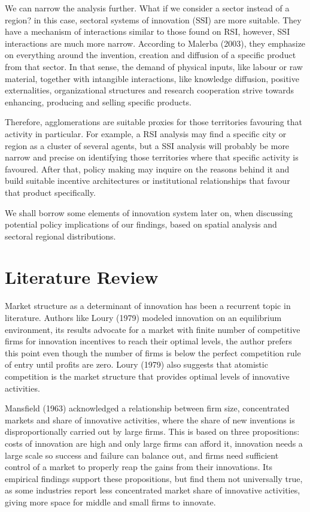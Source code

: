 \documentclass[12pt,a4paper]{article}
\begin{document}
We can narrow the analysis further. What if we consider a sector instead of a region? in this case, sectoral systems of innovation (SSI) are more suitable. They have a mechanism of interactions similar to those found on RSI, however, SSI interactions are much more narrow. According to Malerba (2003), they emphasize on everything around the invention, creation and diffusion of a specific product from that sector. In that sense, the demand of physical inputs, like labour or raw material, together with intangible interactions, like knowledge diffusion, positive externalities, organizational structures and research cooperation strive towards enhancing, producing and selling specific products. 

Therefore, agglomerations are suitable proxies for those territories favouring that activity in particular. For example, a RSI analysis may find a specific city or region as a cluster of several agents, but a SSI analysis will probably be more narrow and precise on identifying those territories where that specific activity is favoured. After that, policy making may inquire on the reasons behind it and build suitable incentive architectures or institutional relationships that favour that product specifically.

We shall borrow some elements of innovation system later on, when discussing potential policy implications of our findings, based on spatial analysis and sectoral regional distributions.

\section{Literature Review}

Market structure as a determinant of innovation has been a recurrent topic in literature. Authors like Loury (1979) modeled innovation on an equilibrium environment, its results advocate for a market with finite number of competitive firms for innovation incentives to reach their optimal levels, the author prefers this point even though the number of firms is below the perfect competition rule of entry until profits are zero. Loury (1979) also suggests that atomistic competition is the market structure that provides optimal levels of innovative activities. 

Mansfield (1963) acknowledged a relationship between firm size, concentrated markets and share of innovative activities, where the share of new inventions is disproportionally carried out by large firms. This is based on three propositions: costs of innovation are high and only large firms can afford it, innovation needs a large scale so success and failure can balance out, and firms need sufficient control of a market to properly reap the gains from their innovations. Its empirical findings support these propositions, but find them not universally true, as some industries report less concentrated market share of innovative activities, giving more space for middle and small firms to innovate. 
\end{document}
